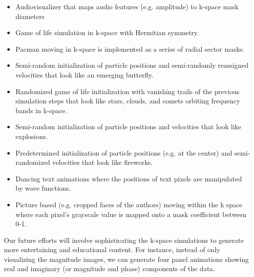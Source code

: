 \documentclass{article}
\begin{document}
\begin{itemize}
\item Audiovisualizer that maps audio features (e.g. amplitude) to k-space mask diameters
\item Game of life \cite{Gardner1970} simulation in k-space with Hermitian symmetry.
\item Pacman moving in k-space is implemented as a series of radial sector masks.
\item Semi-random initialization of particle positions and semi-randomly reassigned velocities that look like an emerging butterfly.
\item Randomized game of life initialization with vanishing trails of the previous simulation steps that look like stars, clouds, and comets orbiting frequency bands in k-space.
\item Semi-random initialization of particle positions and velocities that look like explosions.
\item Predetermined initialization of particle positions (e.g. at the center) and semi-randomized velocities that look like fireworks.
\item Dancing text animations where the positions of text pixels are manipulated by wave functions.
\item Picture based (e.g. cropped faces of the authors) moving within the k space where each pixel’s grayscale value is mapped onto a mask coefficient between 0-1.
\end{itemize}

Our future efforts will involve sophisticating the k-space simulations to generate more entertaining and educational content. For instance, instead of only visualizing the magnitude images, we can generate four panel animations showing real and imaginary (or magnitude and phase) components of the data.
\end{document}

